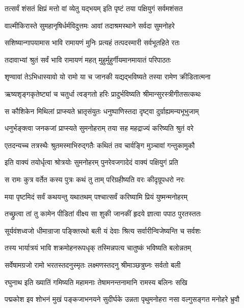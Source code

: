 \twolineshloka
{तत्सर्वं शंसतं क्षिप्रं मत्तो वां व्येतु यद्भयम्}
{इति पृष्टं तया पक्षियुगं सर्वमशंसत}%


\twolineshloka
{वाल्मीकिरास्ते सुमहानृषिर्धर्मविदुत्तमः}
{आवां तदाश्रमस्थाने सर्वदा सुमनोहरे}%

\twolineshloka
{सशिष्यान्गापयामास भावि रामायणं मुनिः}
{प्रत्यहं तत्पदस्मारी सर्वभूतहिते रतः}%

\twolineshloka
{तदावाभ्यां श्रुतं सर्वं भावि रामायणं महत्}
{मुहुर्मुहुर्गीयमानमायातं परिपाठतः}%

\twolineshloka
{शृण्वावां तेऽभिधास्यावो यो रामो या च जानकी}
{यद्यद्भविष्यते तस्या रामेण क्रीडितात्मना}%

\twolineshloka
{ऋष्यशृङ्गकृतेष्ट्यां च चतुर्धा त्वङ्गतो हरिः}
{प्रादुर्भविष्यति श्रीमान्सुरस्त्रीगीतसत्कथः}%

\twolineshloka
{स कौशिकेन मिथिलां प्राप्स्यते भ्रातृसंयुतः}
{धनुष्पाणिस्तदा दृष्ट्वा दुर्ग्राह्यमन्यभूभुजाम्}%

\twolineshloka
{धनुर्भङ्क्त्वा जनकजां प्राप्स्यते सुमनोहराम्}
{तया सह महद्राज्यं करिष्यति श्रुतं वरे}%

\twolineshloka
{एतदन्यच्च तत्रस्थैः श्रुतमस्माभिरुद्गतैः}
{कथितं तव चार्वङ्गि मुञ्चावां गन्तुकामुकौ}%

\twolineshloka
{इति वाक्यं तयोर्धृत्वा श्रोत्रयोः सुमनोहरम्}
{पुनरेवजगादेदं वाक्यं पक्षियुगं प्रति}%

\twolineshloka
{स रामः कुत्र वर्तेत कस्य पुत्रः कथं तु ताम्}
{परिग्रहीष्यति वरः कीदृग्रूपधरो नरः}%

\twolineshloka
{मया पृष्टमिदं सर्वं कथयन्तु यथातथम्}
{पश्चात्सर्वं करिष्यामि प्रियं युष्मन्मनोहरम्}%

\twolineshloka
{तच्छ्रुत्वा तां तु कामेन पीडितां वीक्ष्य सा शुकी}
{जानकीं हृदये ज्ञात्वा पपाठ पुरतस्ततः}%

\twolineshloka
{सूर्यवंशध्वजो धीमान्राजा पङ्क्तिरथो बली}
{यं देवाः श्रित्य सर्वारीन्विजेष्यन्ति च सर्वशः}%

\twolineshloka
{तस्य भार्यात्रयं भावि शक्रमोहनरूपधृक्}
{तस्मिन्नपत्य चातुष्कं भविष्यति बलोन्नतम्}%

\twolineshloka
{सर्वेषामग्रजो रामो भरतस्तदनुस्मृतः}
{लक्ष्मणस्तदनु श्रीमाञ्छत्रुघ्नः सर्वतो बली}%

\twolineshloka
{रघुनाथ इति ख्यातिं गमिष्यति महामनाः}
{तेषामनन्तनामानि रामस्य बलिनः सखि}%

\fourlineindentedshloka
{पद्मकोश इव शोभनं मुखं}
{पङ्कजाभनयने सुदीर्घके}
{उन्नता पृथुमनोहरा नसा}
{वल्गुसङ्गत मनोहरे भ्रुवौ}%

